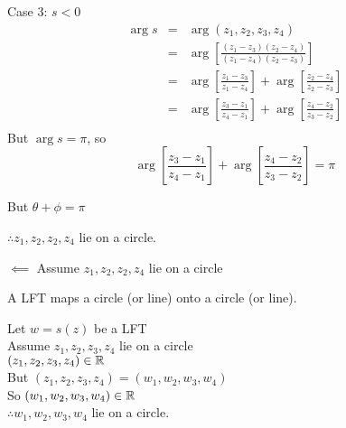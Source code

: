 \documentclass[letterpaper,12pt,fleqn]{article}
\renewcommand{\o}{\theta}
\newcommand{\p}{\phi}
\begin{document}
\begin{theproof}
\begin{description}
\begin{description}
    \item Case 3: $s<0$
      \begin{eqnarray*}
        \arg{s} &=& \arg(z_1,z_2,z_3,z_4) \\
        &=& \arg\left[\frac{(z_1-z_3)(z_2-z_4)}{(z_1-z_4)(z_2-z_3)}\right] \\
        &=& \arg\left[\frac{z_1-z_3}{z_1-z_4}\right]+
        \arg\left[\frac{z_2-z_4}{z_2-z_3}\right] \\
        &=& \arg\left[\frac{z_3-z_1}{z_4-z_1}\right]+
        \arg\left[\frac{z_4-z_2}{z_3-z_2}\right] \\
      \end{eqnarray*}
      But $\arg{s}=\pi$, so
      \[\arg\left[\frac{z_3-z_1}{z_4-z_1}\right]+
      \arg\left[\frac{z_4-z_2}{z_3-z_2}\right] = \pi\]


      But $\o+\p=\pi$

      $\therefore z_1,z_2,z_2,z_4$ lie on a circle.
    \end{description}
    
  \item $\impliedby$ Assume $z_1,z_2,z_2,z_4$ lie on a circle
  \end{description}
\end{theproof}

\begin{corollary}
  A LFT maps a circle (or line) onto a circle (or line).
\end{corollary}

\begin{theproof}
  Let $w=s(z)$ be a LFT \\
  Assume $z_1,z_2,z_3,z_4$ lie on a circle \\
  $(z_1,z_2,z_3,z_4)\in\mathbb{R}$ \\
  But $(z_1,z_2,z_3,z_4)=(w_1,w_2,w_3,w_4)$ \\
  So $(w_1,w_2,w_3,w_4)\in\mathbb{R}$ \\
  $\therefore w_1,w_2,w_3,w_4$ lie on a circle.
\end{theproof}
\end{document}
